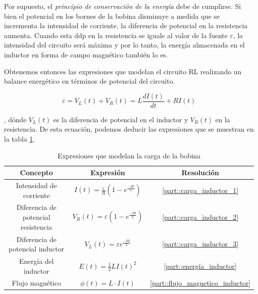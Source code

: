 \documentclass[../main.tex]{subfiles}
\begin{document}
Por supuesto, el \textit{principio de conservación de la energía} debe de cumplirse. Si bien el potencial en los bornes de la bobina disminuye a medida que se incrementa la intensidad de corriente, la diferencia de potencial en la resistencia aumenta. Cuando esta ddp en la resistencia se iguale al valor de la fuente $\varepsilon$, la intensidad del circuito será máxima y por lo tanto, la energía almacenada en el inductor en forma de campo magnético también lo es.

Obtenemos entonces las expresiones que modelan el circuito RL realizando un balance energético en términos de potencial del circuito.


\begin{equation}
    \label{eqq::carga_bobina}
    \varepsilon = V_L(t) + V_R(t) = L \frac{d I(t)}{d t} + R I(t)
\end{equation}

, dónde $V_L(t)$ es la diferencia de potencial en el inductor y $V_R(t)$ en la resistencia. De esta ecuación, podemos deducir las expresiones que se muestran en la tabla \ref{tab::ecuaciones_carga_rl}.\\

\begin{table}[!ht]
        \begin{center}
            \begin{tabular}{|| c | c | c ||}
                \hline
                \textbf{Concepto} & \textbf{Expresión} &  \textbf{Resolución}\\ \hline
                Intensidad de corriente & $I(t) = \frac{\varepsilon}{R} \left( 1 - e^{\frac{-Rt}{L}}\right)$ & \ref{part::carga_inductor_1}\\
                Diferencia de potencial resistencia & $V_R(t) = \varepsilon \left( 1 - e^{\frac{-Rt}{L}}\right)$ & \ref{part::carga_inductor_2} \\ 
                Diferencia de potencial inductor & $V_L(t) = \varepsilon   e^{\frac{-Rt}{L}}$ & \ref{part::carga_inductor_3} \\ 
                Energía del inductor & $E(t) = \frac{1}{2}LI(t)^2 $ & \ref{part::energía_inductor} \\
                Flujo magnético & $\phi (t) = L \cdot I(t)$ & \ref{part::flujo_magnetico_inductor} \\
                \hline
                \end{tabular}
                \caption{Expresiones que modelan la carga de la bobina}
                \label{tab::ecuaciones_carga_rl}
        \end{center}
    \end{table}
\end{document}
